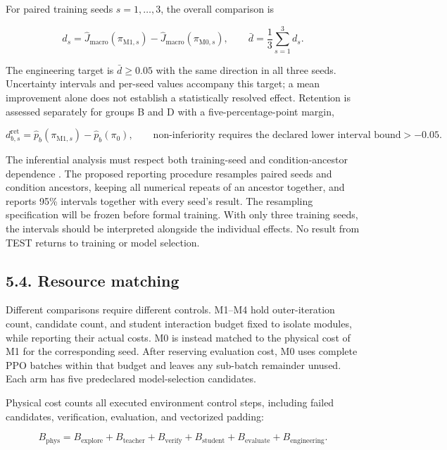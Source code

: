\documentclass[
  american,
  11pt,
  a4paper,
]{article}
\begin{document}
For paired training seeds \(s=1,\ldots,3\), the overall comparison is

\[
d_s=\widehat J_{\mathrm{macro}}(\pi_{{\mathrm{M1}},s})
-\widehat J_{\mathrm{macro}}(\pi_{{\mathrm{M0}},s}),\qquad
\bar d=\frac13\sum_{s=1}^{3}d_s.
\tag{39}\label{eq:39}
\]

The engineering target is \(\bar d\ge0.05\) with the same direction in
all three seeds. Uncertainty intervals and per-seed values accompany
this target; a mean improvement alone does not establish a statistically
resolved effect. Retention is assessed separately for groups B and D
with a five-percentage-point margin,

\[
d_{b,s}^{\mathrm{ret}}=
\widehat p_b(\pi_{{\mathrm{M1}},s})-\widehat p_b(\pi_0),
\qquad
\text{non-inferiority requires the declared lower interval bound}>-0.05.
\tag{40}\label{eq:40}
\]

The inferential analysis must respect both training-seed and
condition-ancestor dependence \cite{agarwal2021rliable}. The proposed reporting procedure
resamples paired seeds and condition ancestors, keeping all numerical
repeats of an ancestor together, and reports 95\% intervals together
with every seed's result. The resampling specification will be frozen
before formal training. With only three training seeds, the intervals
should be interpreted alongside the individual effects. No result from
TEST returns to training or model selection.

\subsection{5.4. Resource matching}\label{resource-matching}

Different comparisons require different controls. M1--M4 hold
outer-iteration count, candidate count, and student interaction budget
fixed to isolate modules, while reporting their actual costs. M0 is
instead matched to the physical cost of M1 for the corresponding seed.
After reserving evaluation cost, M0 uses complete PPO batches within
that budget and leaves any sub-batch remainder unused. Each arm has five
predeclared model-selection candidates.

Physical cost counts all executed environment control steps, including
failed candidates, verification, evaluation, and vectorized padding:

\[
B_{\mathrm{phys}}
=B_{\mathrm{explore}}+B_{\mathrm{teacher}}+B_{\mathrm{verify}}
+B_{\mathrm{student}}+B_{\mathrm{evaluate}}+B_{\mathrm{engineering}}.
\tag{41}\label{eq:41}
\]
\end{document}
